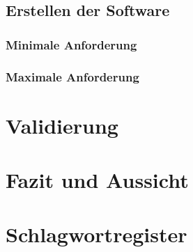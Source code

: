 \documentclass[10pt,a4paper]{report}
\begin{document}
\section{Erstellen der Software}
\subsection{Minimale Anforderung}
\subsection{Maximale Anforderung}

\chapter{Validierung}

\chapter{Fazit und Aussicht}

\chapter{Schlagwortregister}
\printindex
\end{document}
